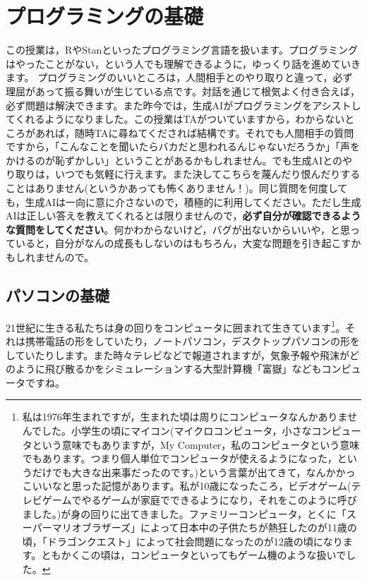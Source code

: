 \documentclass{ltjsbook}
\begin{document}
\chapter{プログラミングの基礎}
\label{x16_Programming1}
この授業は，RやStanといったプログラミング言語を扱います。プログラミングはやったことがない，という人でも理解できるように，ゆっくり話を進めていきます。
プログラミングのいいところは，人間相手とのやり取りと違って，必ず理屈があって振る舞いが生じている点です。対話を通じて根気よく付き合えば，必ず問題は解決できます。また昨今では，生成AIがプログラミングをアシストしてくれるようになりました。この授業はTAがついていますから，わからないところがあれば，随時TAに尋ねてくだされば結構です。それでも人間相手の質問ですから，「こんなことを聞いたらバカだと思われるんじゃないだろうか」「声をかけるのが恥ずかしい」ということがあるかもしれません。でも生成AIとのやり取りは，いつでも気軽に行えます。また決してこちらを蔑んだり恨んだりすることはありません(というかあっても怖くありません！)。同じ質問を何度しても，生成AIは一向に意に介さないので，積極的に利用してください。ただし生成AIは正しい答えを教えてくれるとは限りませんので，\textbf{必ず自分が確認できるような質問をしてください}。何かわからないけど，バグが出ないからいいや，と思っていると，自分がなんの成長もしないのはもちろん，大変な問題を引き起こすかもしれませんので。

\section{パソコンの基礎}

21世紀に生きる私たちは身の回りをコンピュータに囲まれて生きています\footnote{私は1976年生まれですが，生まれた頃は周りにコンピュータなんかありませんでした。小学生の頃にマイコン(マイクロコンピュータ，小さなコンピュータという意味でもありますが，My Computer，私のコンピュータという意味でもあります。つまり個人単位でコンピュータが使えるようになった，というだけでも大きな出来事だったのです。)という言葉が出てきて，なんかかっこいいなと思った記憶があります。私が10歳になったころ，ビデオゲーム(テレビゲームでやるゲームが家庭でできるようになり，それをこのように呼びました。)が身の回りに出てきました。ファミリーコンピュータ，とくに「スーパーマリオブラザーズ」によって日本中の子供たちが熱狂したのが11歳の頃，「ドラゴンクエスト」によって社会問題になったのが12歳の頃になります。ともかくこの頃は，コンピュータといってもゲーム機のような扱いでした。}。それは携帯電話の形をしていたり，ノートパソコン，デスクトップパソコンの形をしていたりします。また時々テレビなどで報道されますが，気象予報や飛沫がどのように飛び散るかをシミュレーションする大型計算機「富嶽」などもコンピュータですね。
\end{document}
